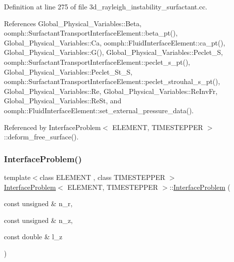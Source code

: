 Definition at line 275 of file 3d\+\_\+rayleigh\+\_\+instability\+\_\+surfactant.\+cc.



References Global\+\_\+\+Physical\+\_\+\+Variables\+::\+Beta, oomph\+::\+Surfactant\+Transport\+Interface\+Element\+::beta\+\_\+pt(), Global\+\_\+\+Physical\+\_\+\+Variables\+::\+Ca, oomph\+::\+Fluid\+Interface\+Element\+::ca\+\_\+pt(), Global\+\_\+\+Physical\+\_\+\+Variables\+::\+G(), Global\+\_\+\+Physical\+\_\+\+Variables\+::\+Peclet\+\_\+S, oomph\+::\+Surfactant\+Transport\+Interface\+Element\+::peclet\+\_\+s\+\_\+pt(), Global\+\_\+\+Physical\+\_\+\+Variables\+::\+Peclet\+\_\+\+St\+\_\+S, oomph\+::\+Surfactant\+Transport\+Interface\+Element\+::peclet\+\_\+strouhal\+\_\+s\+\_\+pt(), Global\+\_\+\+Physical\+\_\+\+Variables\+::\+Re, Global\+\_\+\+Physical\+\_\+\+Variables\+::\+Re\+Inv\+Fr, Global\+\_\+\+Physical\+\_\+\+Variables\+::\+Re\+St, and oomph\+::\+Fluid\+Interface\+Element\+::set\+\_\+external\+\_\+pressure\+\_\+data().



Referenced by Interface\+Problem$<$ E\+L\+E\+M\+E\+N\+T, T\+I\+M\+E\+S\+T\+E\+P\+P\+E\+R $>$\+::deform\+\_\+free\+\_\+surface().

\mbox{\label{classInterfaceProblem_af1ab49eb511b5a8db27e7b4e509a0c5c}} 
\subsubsection{\texorpdfstring{Interface\+Problem()}{InterfaceProblem()}\hspace{0.1cm}{\footnotesize\ttfamily [2/3]}}
{\footnotesize\ttfamily template$<$class E\+L\+E\+M\+E\+NT , class T\+I\+M\+E\+S\+T\+E\+P\+P\+ER $>$ \\
\hyperlink{classInterfaceProblem}{Interface\+Problem}$<$ E\+L\+E\+M\+E\+NT, T\+I\+M\+E\+S\+T\+E\+P\+P\+ER $>$\+::\hyperlink{classInterfaceProblem}{Interface\+Problem} (\begin{DoxyParamCaption}\item[{const unsigned \&}]{n\+\_\+r,  }\item[{const unsigned \&}]{n\+\_\+z,  }\item[{const double \&}]{l\+\_\+z }\end{DoxyParamCaption})}



